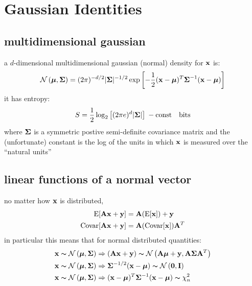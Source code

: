 \documentclass[12pt]{article}
\begin{document}
\clearpage
\section{Gaussian Identities}



\subsection{multidimensional gaussian}
a $d$-dimensional multidimensional gaussian (normal) density for $\xx$
is:
\begin{align}
\normal{\mmm}{\Sm} = 
(2\pi)^{-d/2}|\Sm|^{-1/2}
\exp\left[-\frac{1}{2}(\xx-\mmm)^T\Sm^{-1}(\xx-\mmm)\right]
\end{align}
it has entropy:
\begin{align}
S = \frac{1}{2}\log_2\left[ (2\pi e)^d|\Sm| \right] \: - \text{const}
\quad \text{bits}
\end{align}
where $\Sm$ is a symmetric postive semi-definite covariance matrix and
the (unfortunate) constant is the log of the units in which $\xx$ is
measured over the ``natural units''

\subsection{linear functions of a normal vector}
no matter how $\xx$ is distributed,
\begin{align}
\mathrm{E}[\AA\xx+\yy] &= \AA(\mathrm{E}[\xx]) + \yy \\
\mathrm{Covar}[\AA\xx + \yy] &= \AA(\mathrm{Covar}[\xx])\AA^T
\end{align}
in particular this means that for normal distributed quantities:
\begin{align}
\xx \distrib \normal{\mmm}{\Sm} &\Rightarrow
(\AA\xx + \yy) \distrib \normal{\AA\mmm + \yy}{\AA \Sm \AA^T} \\
\xx \distrib \normal{\mmm}{\Sm} &\Rightarrow
\Sm^{-1/2}(\xx - \mmm) \distrib \normal{\ZZ}{\II} \\
\xx \distrib \normal{\mmm}{\Sm} &\Rightarrow
(\xx - \mmm)^T\Sm^{-1}(\xx - \mmm) \distrib \chi^2_n 
\end{align}
\end{document}
